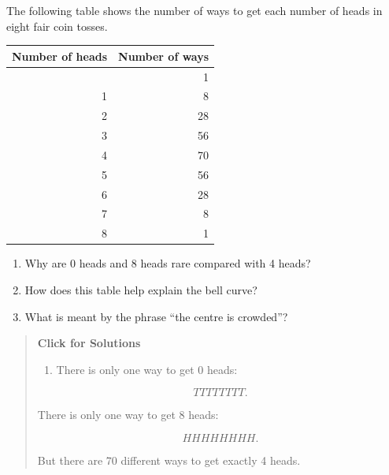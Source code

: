 \documentclass[
  letterpaper,
  DIV=11,
  numbers=noendperiod]{scrreprt}
\newcounter{none} %
\providecommand{\tightlist}{%
  \setlength{\itemsep}{0pt}\setlength{\parskip}{0pt}}
\begin{document}
\begin{tcolorbox}[enhanced jigsaw, arc=.35mm, bottomrule=.15mm, bottomtitle=1mm, breakable, colback=white, colbacktitle=quarto-callout-note-color!10!white, colframe=quarto-callout-note-color-frame, coltitle=black, left=2mm, leftrule=.75mm, opacityback=0, opacitybacktitle=0.6, rightrule=.15mm, title=\textcolor{quarto-callout-note-color}{\faInfo}\hspace{0.5em}{Question 12}, titlerule=0mm, toprule=.15mm, toptitle=1mm]

The following table shows the number of ways to get each number of heads
in eight fair coin tosses.

{\def\LTcaptype{none} %
\begin{longtable}[]{@{}rr@{}}
\toprule\noalign{}
Number of heads & Number of ways \\
\midrule\noalign{}
\endhead
\bottomrule\noalign{}
\endlastfoot
0 & 1 \\
1 & 8 \\
2 & 28 \\
3 & 56 \\
4 & 70 \\
5 & 56 \\
6 & 28 \\
7 & 8 \\
8 & 1 \\
\end{longtable}
}

\begin{enumerate}
\def\labelenumi{\alph{enumi}.}
\item
  Why are 0 heads and 8 heads rare compared with 4 heads?
\item
  How does this table help explain the bell curve?
\item
  What is meant by the phrase ``the centre is crowded''?
\end{enumerate}

\begin{quote}
\textbf{Click for Solutions}

\begin{enumerate}
\def\labelenumi{\alph{enumi}.}
\tightlist
\item
  There is only one way to get 0 heads:
\end{enumerate}

\[
TTTTTTTT.
\]

There is only one way to get 8 heads:

\[
HHHHHHHH.
\]

But there are 70 different ways to get exactly 4 heads.


\end{quote}
\end{tcolorbox}
\end{document}
